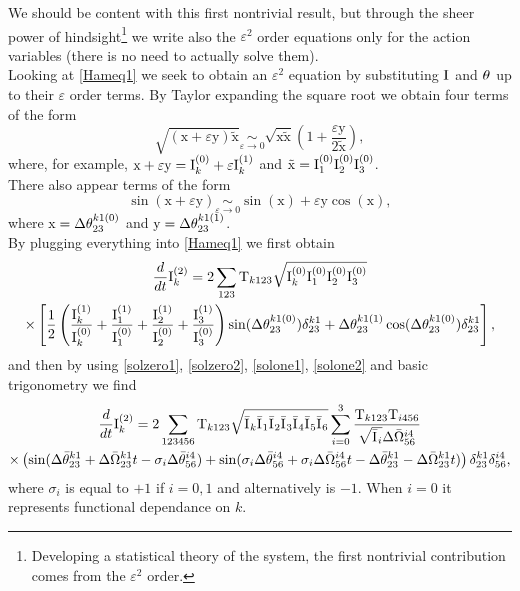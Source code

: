 We should be content with this first nontrivial result, but through the sheer power of hindsight\footnote{Developing a 
statistical theory of the system, the first nontrivial contribution comes from the $\varepsilon^2$ order.}
we write also the 
$\varepsilon^2$ order equations only for the action variables (there is no need to actually solve them). \\
Looking at \eqref{Hameq1} we seek to obtain an $\varepsilon^2$ equation by substituting $\mathrm{I}^{}$ and $\theta^{}$ up to their $\varepsilon$ order terms. By Taylor expanding the square root 
we obtain four terms of the form
\begin{equation}
    \sqrt{(\mathrm{x} +\varepsilon \mathrm{y})\mathrm{\tilde{x}}} \underset{\varepsilon \rightarrow 0}{\sim} 
    \sqrt{\mathrm{x}\mathrm{\tilde{x}}}\left( 1 + \frac{\varepsilon \mathrm{y}}{2\mathrm{\tilde{x}}}\right),
\end{equation}
where, for example, $\mathrm{x} + \varepsilon \mathrm{y} = \mathrm{I}^{(0)}_k + \varepsilon \mathrm{I}^{(1)}_k$ and $\mathrm{\tilde{x}} = \mathrm{I}^{(0)}_1\mathrm{I}^{(0)}_2\mathrm{I}^{(0)}_3$.\\
There also appear terms of the form
\begin{equation}
    \sin(\mathrm{x} + \varepsilon \mathrm{y}) \underset{\varepsilon \rightarrow 0}{\sim} \sin(\mathrm{x}) + \varepsilon \mathrm{y} \cos(\mathrm{x}),
\end{equation} 
where $\mathrm{x} = \Delta\theta^{k1(0)}_{23}$ and $\mathrm{y} = \Delta\theta^{k1(1)}_{23}$.\\
By plugging everything into \eqref{Hameq1} we first obtain
\begin{multline}
    \frac{d}{dt} \mathrm{I}^{(2)}_k = 2 \sum_{123} \mathrm{T}_{k123} \sqrt{\mathrm{I}^{(0)}_k\mathrm{I}^{(0)}_1\mathrm{I}^{(0)}_2\mathrm{I}^{(0)}_3} \\ \times \left[ \frac{1}{2}\left(\frac{\mathrm{I}^{(1)}_k}{\mathrm{I}^{(0)}_k}+\frac{\mathrm{I}^{(1)}_1}{\mathrm{I}^{(0)}_1}+
    \frac{\mathrm{I}^{(1)}_2}{\mathrm{I}^{(0)}_2}+\frac{\mathrm{I}^{(1)}_3}{\mathrm{I}^{(0)}_3} \right)\sin(\Delta\theta^{k1(0)}_{23})\delta^{k1}_{23} + 
    \Delta\theta^{k1(1)}_{23}\cos(\Delta\theta^{k1(0)}_{23}) \delta^{k1}_{23}\right],
\end{multline}
and then by using \eqref{solzero1}, \eqref{solzero2}, \eqref{solone1}, \eqref{solone2} and basic trigonometry we find
\begin{multline}
    \frac{d}{dt} \mathrm{I}^{(2)}_k = 2 \sum_{123456}\mathrm{T}_{k123} \sqrt{\bar{\mathrm{I}^{}}_k\bar{\mathrm{I}^{}}_1\bar{\mathrm{I}^{}}_2\bar{\mathrm{I}^{}}_3\bar{\mathrm{I}^{}}_4\bar{\mathrm{I}^{}}_5\bar{\mathrm{I}^{}}_6} 
    \sum_{i=0}^{3}\frac{\mathrm{T}_{k123}\mathrm{T}_{i456}}{\sqrt{\bar{\mathrm{I}^{}}_i}\Delta\bar{\Omega}^{i4}_{56}} \\
    \times\left(\sin(\Delta\bar{\theta}^{k1}_{23} + \Delta\bar{\Omega}^{k1}_{23}t - \sigma_i \Delta\bar{\theta}^{i4}_{56}) 
    + \sin(\sigma_i \Delta\bar{\theta}^{i4}_{56} + \sigma_i\Delta\bar{\Omega}^{i4}_{56}t -\Delta\bar{\theta}^{k1}_{23} - \Delta\bar{\Omega}^{k1}_{23}t)  \right)\delta^{k1}_{23}\delta^{i4}_{56}, 
    \label{eqeps2}
\end{multline}
where $\sigma_i$ is equal to $+1$ if $i=0,1$ and alternatively is $-1$. When $i=0$ it represents functional dependance on $k$.\\

